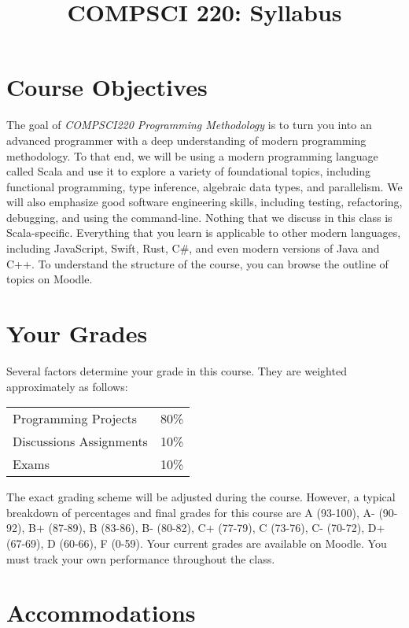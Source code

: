 \documentclass{article}
\begin{document}
\title{COMPSCI 220: Syllabus}
\date{}

\maketitle

\section{Course Objectives}

The goal of \emph{COMPSCI220 Programming Methodology} is to turn you into an
advanced programmer with a deep understanding of modern programming
methodology. To that end, we will be using a modern programming language called
Scala and use it to explore a variety of foundational topics, including
functional programming, type inference, algebraic data types, and parallelism.
We will also emphasize good software engineering skills, including testing,
refactoring, debugging, and using the command-line. Nothing that we discuss
in this class is Scala-specific. Everything that you learn is applicable to
other modern languages, including JavaScript, Swift, Rust, C\#, and even
modern versions of Java and C++. To understand the structure of the course, you
can browse the outline of topics on Moodle.

\section{Your Grades}

Several factors determine your grade in this course. They are weighted
approximately as follows:

\begin{tabular}{|l|l|}
\hline
Programming Projects	  & 80\% \\
Discussions Assignments	& 10\% \\
Exams	                  & 10\% \\
\hline
\end{tabular}

The exact grading scheme will be adjusted during the course. However, a typical
breakdown of percentages and final grades for this course are A (93-100), A-
(90-92), B+ (87-89), B (83-86), B- (80-82), C+ (77-79), C (73-76), C- (70-72),
D+ (67-69), D (60-66), F (0-59). Your current grades are available on Moodle.
You must track your own performance throughout the class.

\section{Accommodations}
\end{document}
